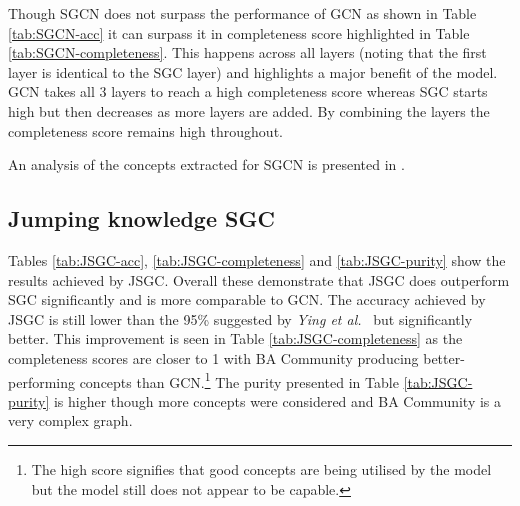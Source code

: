 Though SGCN does not surpass the performance of GCN as shown in Table \ref{tab:SGCN-acc} it can surpass it in completeness score highlighted in Table \ref{tab:SGCN-completeness}.
This happens across all layers (noting that the first layer is identical to the SGC layer) and highlights a major benefit of the model.
GCN takes all 3 layers to reach a high completeness score whereas SGC starts high but then decreases as more layers are added.
By combining the layers the completeness score remains high throughout.

An analysis of the concepts extracted for SGCN is presented in .

\subsection{Jumping knowledge SGC}
\label{sec:Jump-SGC}







Tables \ref{tab:JSGC-acc}, \ref{tab:JSGC-completeness} and \ref{tab:JSGC-purity} show the results achieved by JSGC.
Overall these demonstrate that JSGC does outperform SGC significantly and is more comparable to GCN.
The accuracy achieved by JSGC is still lower than the 95\% suggested by \textit{Ying et al.}~\cite{ying2019gnnexplainer} but significantly better.
This improvement is seen in Table \ref{tab:JSGC-completeness} as the completeness scores are closer to 1 with BA Community producing better-performing concepts than GCN.\footnote{The high score signifies that good concepts are being utilised by the model but the model still does not appear to be capable.}
The purity presented in Table \ref{tab:JSGC-purity} is higher though more concepts were considered and BA Community is a very complex graph.

